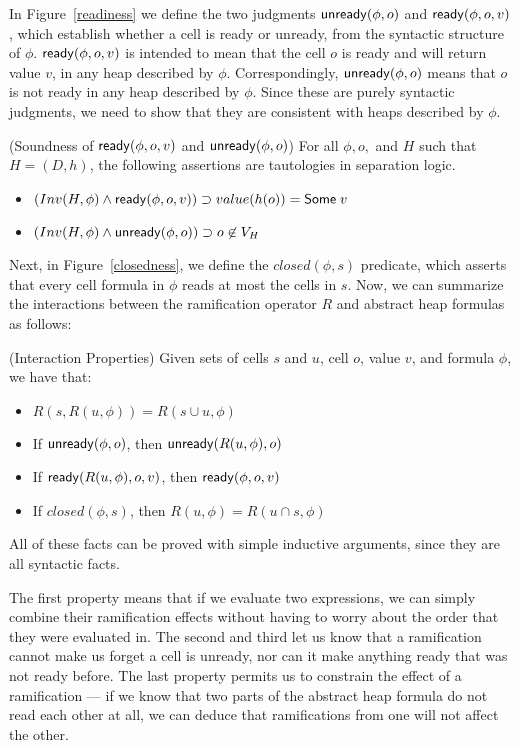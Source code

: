 \documentclass[natbib]{sigplanconf}
\begin{document}
In Figure~\ref{readiness} we define the two judgments $\mbox{\textsf{{unready}}}({\phi}, {o})$
and $\mbox{\textsf{{ready}}}({\phi}, {o}, {v})$, which establish whether a cell is ready or
unready, from the syntactic structure of $\phi$. $\mbox{\textsf{{ready}}}({\phi}, {o}, {v})$ is intended
to mean that the cell $o$ is ready and will return value $v$, in any heap 
described by $\phi$. Correspondingly, $\mbox{\textsf{{unready}}}({\phi}, {o})$ means that $o$ is not 
ready in any heap described by $\phi$. Since these are purely syntactic judgments, 
we need to show that they are consistent with heaps described by $\phi$. 

\begin{prop}{(Soundness of $\mbox{\textsf{{ready}}}({\phi}, {o}, {v})$ and $\mbox{\textsf{{unready}}}({\phi}, {o})$)}
For all $\phi, o,$ and $H$ such that $H = (D,h)$, the following assertions
are tautologies in separation logic. 

\begin{itemize}
\item $(Inv(H, \phi) \land \mbox{\textsf{{ready}}}({\phi}, {o}, {v})) \supset value(h(o)) = \mbox{\textsf{{Some}}}\;v$
\item $(Inv(H, \phi) \land \mbox{\textsf{{unready}}}({\phi}, {o})) \supset o \not\in V_H$
\end{itemize}
\end{prop}

Next, in Figure~\ref{closedness}, we define the $closed(\phi, s)$
predicate, which asserts that every cell formula in $\phi$ reads at
most the cells in $s$. Now, we can summarize the interactions between
the ramification operator $R$ and abstract heap formulas as follows:

\begin{prop}{(Interaction Properties)}
Given sets of cells $s$ and $u$, cell $o$, value $v$, and formula $\phi$, we have
that:
\begin{itemize}
\item $R(s, R(u, \phi)) = R(s \cup u, \phi)$
\item If $\mbox{\textsf{{unready}}}({\phi}, {o})$, then $\mbox{\textsf{{unready}}}({R(u, \phi)}, {o})$ 
\item If $\mbox{\textsf{{ready}}}({R(u, \phi)}, {o}, {v})$, then $\mbox{\textsf{{ready}}}({\phi}, {o}, {v})$ 
\item If $closed(\phi, s)$, then $R(u, \phi) = R(u \cap s, \phi)$ 
\end{itemize}
\end{prop}

All of these facts can be proved with simple inductive arguments, since
they are all syntactic facts. 

The first property means that if we evaluate two expressions, we can
simply combine their ramification effects without having to worry
about the order that they were evaluated in. The second and third let
us know that a ramification cannot make us forget a cell is unready,
nor can it make anything ready that was not ready before. The last
property permits us to constrain the effect of a ramification --- if we
know that two parts of the abstract heap formula do not read each
other at all, we can deduce that ramifications from one will not
affect the other.
\end{document}
